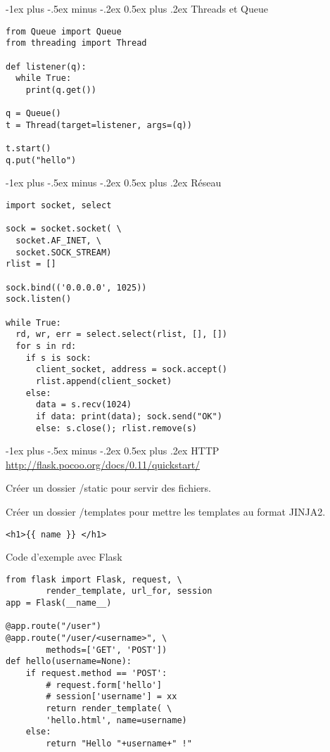 \documentclass[10pt,landscape]{article}
\makeatletter
\renewcommand{\section}{\@startsection{section}{1}{0mm}%
                                {-1ex plus -.5ex minus -.2ex}%
                                {0.5ex plus .2ex}%
                                {\normalfont\large\bfseries}}
\makeatother
\begin{document}
\begin{multicols}{3}
\section{Threads et Queue}

\begin{lstlisting}
from Queue import Queue
from threading import Thread

def listener(q):
  while True:
    print(q.get())

q = Queue()
t = Thread(target=listener, args=(q))

t.start()
q.put("hello")
\end{lstlisting}

\section{Réseau}

\begin{lstlisting}
import socket, select

sock = socket.socket( \
  socket.AF_INET, \
  socket.SOCK_STREAM)
rlist = []

sock.bind(('0.0.0.0', 1025))
sock.listen()

while True:
  rd, wr, err = select.select(rlist, [], [])
  for s in rd:
    if s is sock:
      client_socket, address = sock.accept()
      rlist.append(client_socket)
    else:
      data = s.recv(1024)
      if data: print(data); sock.send("OK")
      else: s.close(); rlist.remove(s)
\end{lstlisting}

\section{HTTP}
\url{http://flask.pocoo.org/docs/0.11/quickstart/}

Créer un dossier /static pour servir des fichiers.

Créer un dossier /templates pour mettre les templates au format JINJA2.

\begin{lstlisting}
<h1>{{ name }} </h1>
\end{lstlisting}

Code d'exemple avec Flask

\begin{lstlisting}
from flask import Flask, request, \
        render_template, url_for, session
app = Flask(__name__)

@app.route("/user")
@app.route("/user/<username>", \
        methods=['GET', 'POST'])
def hello(username=None):
    if request.method == 'POST':
        # request.form['hello']
        # session['username'] = xx
        return render_template( \
        'hello.html', name=username)
    else:
        return "Hello "+username+" !"


\end{lstlisting}
\end{multicols}
\end{document}
